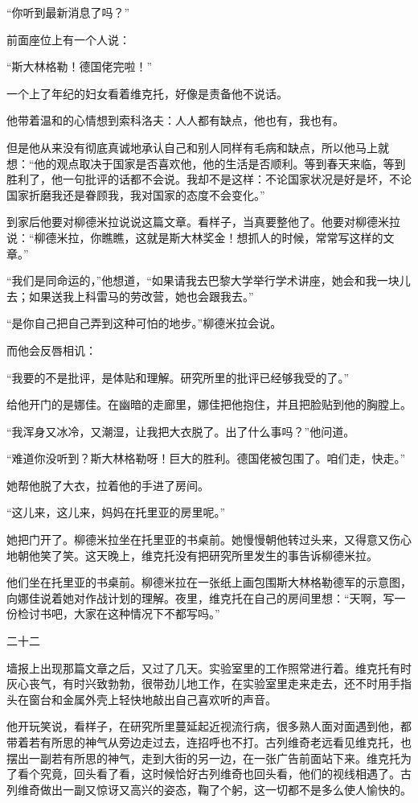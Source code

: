“你听到最新消息了吗？”

前面座位上有一个人说：

“斯大林格勒！德国佬完啦！”

一个上了年纪的妇女看着维克托，好像是责备他不说话。

他带着温和的心情想到索科洛夫：人人都有缺点，他也有，我也有。

但是他从来没有彻底真诚地承认自己和别人同样有毛病和缺点，所以他马上就想：“他的观点取决于国家是否喜欢他，他的生活是否顺利。等到春天来临，等到胜利了，他一句批评的话都不会说。我却不是这样：不论国家状况是好是坏，不论国家折磨我还是眷顾我，我对国家的态度不会变化。”

到家后他要对柳德米拉说说这篇文章。看样子，当真要整他了。他要对柳德米拉说：“柳德米拉，你瞧瞧，这就是斯大林奖金！想抓人的时候，常常写这样的文章。”

“我们是同命运的，”他想道，“如果请我去巴黎大学举行学术讲座，她会和我一块儿去；如果送我上科雷马的劳改营，她也会跟我去。”

“是你自己把自己弄到这种可怕的地步。”柳德米拉会说。

而他会反唇相讥：

“我要的不是批评，是体贴和理解。研究所里的批评已经够我受的了。”

给他开门的是娜佳。在幽暗的走廊里，娜佳把他抱住，并且把脸贴到他的胸膛上。

“我浑身又冰冷，又潮湿，让我把大衣脱了。出了什么事吗？”他问道。

“难道你没听到？斯大林格勒呀！巨大的胜利。德国佬被包围了。咱们走，快走。”

她帮他脱了大衣，拉着他的手进了房间。

“这儿来，这儿来，妈妈在托里亚的房里呢。”

她把门开了。柳德米拉坐在托里亚的书桌前。她慢慢朝他转过头来，又得意又伤心地朝他笑了笑。这天晚上，维克托没有把研究所里发生的事告诉柳德米拉。

他们坐在托里亚的书桌前。柳德米拉在一张纸上画包围斯大林格勒德军的示意图，向娜佳说着她对作战计划的理解。夜里，维克托在自己的房间里想：“天啊，写一份检讨书吧，大家在这种情况下不都写吗。”

二十二

墙报上出现那篇文章之后，又过了几天。实验室里的工作照常进行着。维克托有时灰心丧气，有时兴致勃勃，很带劲儿地工作，在实验室里走来走去，还不时用手指头在窗台和金属外壳上轻快地敲出自己喜欢听的声音。

他开玩笑说，看样子，在研究所里蔓延起近视流行病，很多熟人面对面遇到他，都带着若有所思的神气从旁边走过去，连招呼也不打。古列维奇老远看见维克托，也摆出一副若有所思的神气，走到大街的另一边，在一张广告前面站下来。维克托为了看个究竟，回头看了看，这时候恰好古列维奇也回头看，他们的视线相遇了。古列维奇做出一副又惊讶又高兴的姿态，鞠了个躬，这一切都不是多么使人愉快的。

